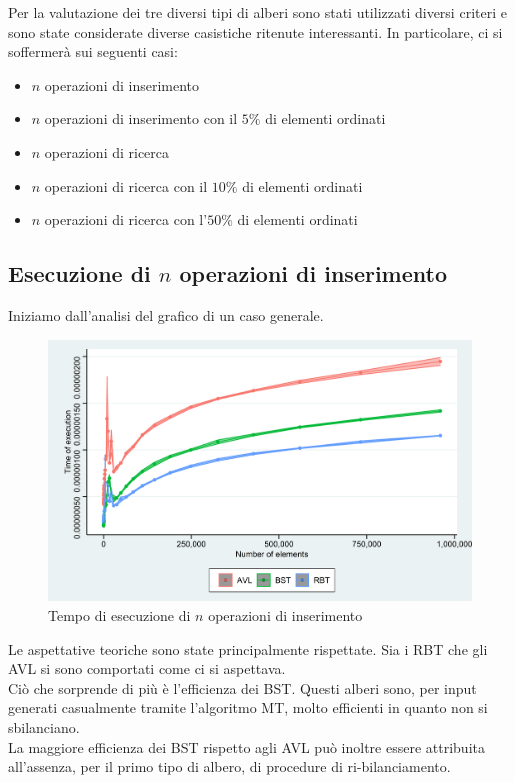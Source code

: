 \documentclass{article}
\begin{document}
	Per la valutazione dei tre diversi tipi di alberi sono stati utilizzati diversi criteri e sono state considerate diverse casistiche ritenute interessanti. In particolare, ci si soffermerà sui seguenti casi:
	
	\begin{itemize}
		\item $n$ operazioni di inserimento
		\item $n$ operazioni di inserimento con il $5\%$ di elementi ordinati
		\item $n$ operazioni di ricerca
		\item $n$ operazioni di ricerca con il $10\%$ di elementi ordinati 
		\item $n$ operazioni di ricerca con l'$50\%$ di elementi ordinati 
	\end{itemize}
	
	\newpage
	
	\subsection{Esecuzione di $n$ operazioni di inserimento}
	\label{subsection:n_op_ins}
	Iniziamo dall'analisi del grafico di un caso generale.
	
	\begin{figure}[h!]
		\centering
  		\includegraphics[width=1 \columnwidth]{Grafici/Grafico_All.png}
  		\caption{Tempo di esecuzione di $n$ operazioni di inserimento}
  		\label{fig:graph2}
	\end{figure}
	
	Le aspettative teoriche sono state principalmente rispettate. Sia i RBT che gli AVL si sono comportati come ci si aspettava.\\
	Ciò che sorprende di più è l'efficienza dei BST. Questi alberi sono, per input generati casualmente tramite l'algoritmo MT, molto efficienti in quanto non si sbilanciano. \\
	La maggiore efficienza dei BST rispetto agli AVL può inoltre essere attribuita all'assenza, per il primo tipo di albero, di procedure di ri-bilanciamento.
	
\end{document}
